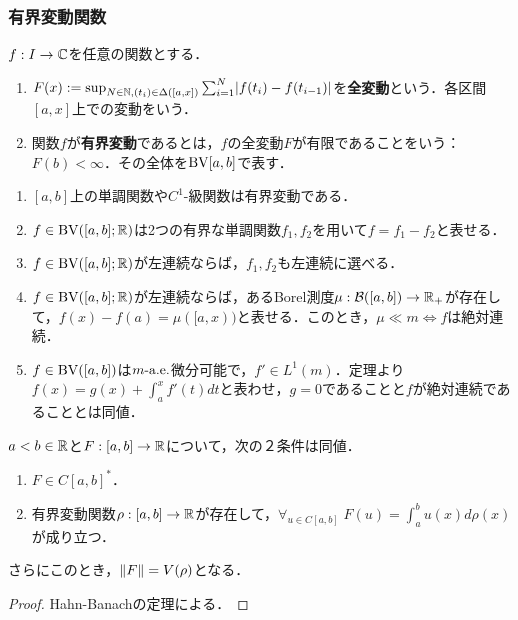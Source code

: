 \documentclass[uplatex,dvipdfmx]{jsreport}
\begin{document}
\subsubsection{有界変動関数}

\begin{definition}
    $f:I\to\mathbb{C}$を任意の関数とする．
    \begin{enumerate}
        \item $F(x):=\sup_{N\in\mathbb{N},(t_i)\in\Delta([a,x])}\sum^N_{i=1}\lvert f(t_i)-f(t_{i-1})\rvert$を\textbf{全変動}という．各区間$[a,x]$上での変動をいう．
        \item 関数$f$が\textbf{有界変動}であるとは，$f$の全変動$F$が有限であることをいう：$F(b)<\infty$．その全体を$\mathrm{BV}[a,b]$で表す．
    \end{enumerate}
\end{definition}

\begin{proposition}[有界変動関数の性質]\mbox{}
    \begin{enumerate}
        \item $[a,b]$上の単調関数や$C^1$-級関数は有界変動である．
        \item $f\in\mathrm{BV}([a,b];\mathbb{R})$は2つの有界な単調関数$f_1,f_2$を用いて$f=f_1-f_2$と表せる．
        \item $f\in\mathrm{BV}([a,b];\mathbb{R})$が左連続ならば，$f_1,f_2$も左連続に選べる．
        \item $f\in\mathrm{BV}([a,b];\mathbb{R})$が左連続ならば，あるBorel測度$\mu:\mathcal{B}([a,b])\to\mathbb{R}_+$が存在して，$f(x)-f(a)=\mu([a,x))$と表せる．このとき，$\mu\ll m\Leftrightarrow f$は絶対連続．
        \item $f\in\mathrm{BV}([a,b])$は$m\text{-a.e.}$微分可能で，$f'\in L^1(m)$．定理より$f(x)=g(x)+\int_a^xf'(t)dt$と表わせ，$g=0$であることと$f$が絶対連続であることとは同値．
    \end{enumerate}
\end{proposition}

\begin{theorem}[有界閉区間上の連続関数の空間の双対空間]
    $a<b\in\mathbb{R}$と$F:[a,b]\to\mathbb{R}$について，次の２条件は同値．
    \begin{enumerate}
        \item $F\in C[a,b]^*$．
        \item 有界変動関数$\rho:[a,b]\to\mathbb{R}$が存在して，$\forall_{u\in C[a,b]}\;F(u)=\int^b_au(x)d\rho(x)$が成り立つ．
    \end{enumerate}
    さらにこのとき，$\|F\|=V(\rho)$となる．
\end{theorem}
\begin{proof}
    Hahn-Banachの定理による．
\end{proof}
\end{document}
